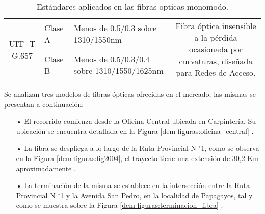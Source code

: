 \begin{table}[H]
\begin{tabular}{|c|p{6.78em}|p{22.945em}|c|}
    \hline
    \multicolumn{1}{|c|}{\multirow{2}[4]{*}{UIT- T G.657}} & Clase A & Menos de 0.5/0.3 sobre 1310/1550nm & \multicolumn{1}{c|}{\multirow{2}[4]{*}{Fibra óptica insensible a la pérdida \newline{} ocasionada por curvaturas, diseñada para Redes de Acceso.}} \bigstrut\\
\cline{2-3}          & Clase B & Menos de 0.5/0.3/0.4 sobre 1310/1550/1625nm &  \bigstrut\\
    \hline
    \end{tabular}%
    \caption{Estándares aplicados en las fibras opticas monomodo.}
  \label{tab:estandares}%
\end{table}%








 

Se analizan tres modelos de fibras ópticas ofrecidas en el mercado, las mismas se presentan a continuación:



\begin{itemize} 


\item[•] El recorrido comienza desde la Oficina Central ubicada en Carpintería. Su ubicación se encuentra detallada en la Figura \ref{dem-figuras:oficina_central} . 





\item[•] La fibra se despliega a lo largo de la Ruta Provincial N $^{\circ}$1, como se observa en la Figura \ref{dem-figuras:fig2004}, el trayecto tiene una extensión de 30,2 Km aproximadamente \cite{secretaria}.


\item[•] La terminación de la misma se establece en la intersección entre la Ruta Provincial N $^{\circ}$1 y la Avenida San Pedro, en la localidad de Papagayos, tal y como se muestra sobre la Figura \ref{dem-figuras:terminacion_fibra} .

\end{itemize}

